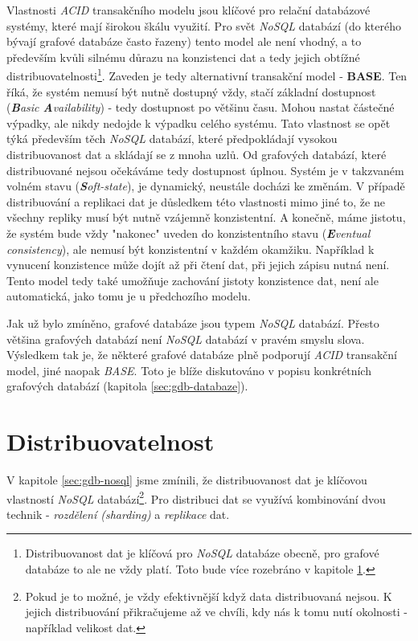 Vlastnosti \textit{ACID} transakčního modelu jsou klíčové pro relační databázové systémy, které mají širokou škálu využití. Pro svět \textit{NoSQL} databází (do kterého bývají grafové databáze často řazeny) tento model ale není vhodný, a to především kvůli silnému důrazu na konzistenci dat a tedy jejich obtížné distribuovatelnosti\footnote{Distribuovanost dat je klíčová pro \textit{NoSQL} databáze obecně, pro grafové databáze to ale ne vždy platí. Toto bude více rozebráno v kapitole \ref{sec:gdb-distribution}.}. Zaveden je tedy alternativní transakční model - \textbf{BASE}. Ten říká, že systém nemusí být nutně dostupný vždy, stačí základní dostupnost (\textit{\textbf{B}asic \textbf{A}vailability}) - tedy dostupnost po většinu času. Mohou nastat částečné výpadky, ale nikdy nedojde k výpadku celého systému. Tato vlastnost se opět týká především těch \textit{NoSQL} databází, které předpokládají vysokou distribuovanost dat a skládají se z mnoha uzlů. Od grafových databází, které distribuované nejsou očekáváme tedy dostupnost úplnou. Systém je v takzvaném volném stavu (\textit{\textbf{S}oft-state}), je dynamický, neustále docházi ke změnám. V případě distribuování a replikaci dat je důsledkem této vlastnosti mimo jiné to, že ne všechny repliky musí být nutně vzájemně konzistentní. A konečně, máme jistotu, že systém bude vždy "nakonec" uveden do konzistentního stavu (\textit{\textbf{E}ventual consistency}), ale nemusí být konzistentní v každém okamžiku. Například k vynucení konzistence může dojít až při čtení dat, při jejich zápisu nutná není. Tento model tedy také umožňuje zachování jistoty konzistence dat, není ale automatická, jako tomu je u předchozího modelu. \cite{Sadalage13}

Jak už bylo zmíněno, grafové databáze jsou typem \textit{NoSQL} databází. Přesto většina grafových databází není \textit{NoSQL} databází v pravém smyslu slova. Výsledkem tak je, že některé grafové databáze plně podporují \textit{ACID} transakční model, jiné naopak \textit{BASE}. Toto je blíže diskutováno v popisu konkrétních grafových databází (kapitola \ref{sec:gdb-databaze}).

\section{Distribuovatelnost}
\label{sec:gdb-distribution}
V kapitole \ref{sec:gdb-nosql} jsme zmínili, že distribuovanost dat je klíčovou vlastností \textit{NoSQL} databází\footnote{Pokud je to možné, je vždy efektivnější když data distribuovaná nejsou. K jejich distribuování přikračujeme až ve chvíli, kdy nás k tomu nutí okolnosti - například velikost dat.}. Pro distribuci dat se využívá kombinování dvou technik - \textit{rozdělení (sharding)} a \textit{replikace} dat.

